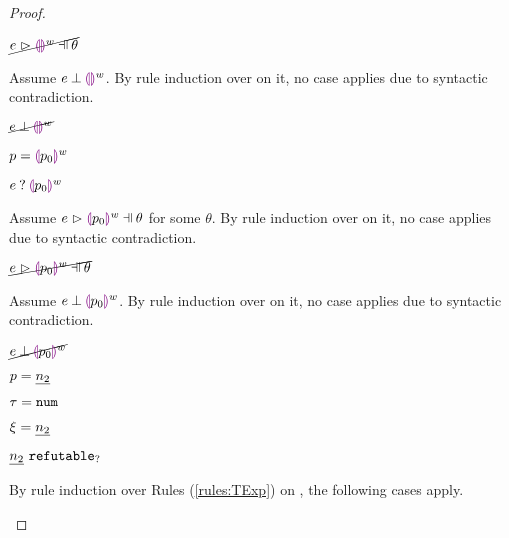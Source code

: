 \begin{proof}
\begin{byCases}
\begin{pfsteps*}
    \item $\cancel{\hpatmatch{e}{\hehole{w}}{\theta}}$ 
    \end{pfsteps*}
    Assume $e \mathbin{\bot} \textcolor{violet}{\llparenthesis}\textcolor{violet}{\rrparenthesis}^{w}$. By rule induction over  on it, no case applies due to syntactic contradiction.
    \begin{pfsteps*}
    \item $\cancel{e \mathbin{\bot} \textcolor{violet}{\llparenthesis}\textcolor{violet}{\rrparenthesis}^{w}}$ 
    \end{pfsteps*}
\item[\text{(\ref{rule:PTHole})}]
    \begin{pfsteps*}
    \item $p=\textcolor{violet}{\llparenthesis} p_0\textcolor{violet}{\rrparenthesis}^{w}$ 
    \item $e \mathbin{?} \textcolor{violet}{\llparenthesis} p_0\textcolor{violet}{\rrparenthesis}^{w}$ 
    \end{pfsteps*}
    Assume $\hpatmatch{e}{\hhole{p_0}{w}}{\theta}$ for some $\theta$. By rule induction over  on it, no case applies due to syntactic contradiction.
    \begin{pfsteps*}
    \item $\cancel{\hpatmatch{e}{\hhole{p_0}{w}}{\theta}}$ 
    \end{pfsteps*}
    Assume $e \mathbin{\bot} \textcolor{violet}{\llparenthesis} p_0\textcolor{violet}{\rrparenthesis}^{w}$. By rule induction over  on it, no case applies due to syntactic contradiction.
    \begin{pfsteps*}
    \item $\cancel{e \mathbin{\bot} \textcolor{violet}{\llparenthesis} p_0\textcolor{violet}{\rrparenthesis}^{w}}$ 
    \end{pfsteps*}
\item[\text{(\ref{rule:PTNum})}]
    \begin{pfsteps*}
    \item $p=\underline{n_2}$ 
    \item $\tau=\mathtt{num}$ 
    \item $\xi=\underline{n_2}$ 
    \item $\underline{n_2} ~\mathtt{refutable}_?$  
    \end{pfsteps*}
    By rule induction over Rules (\ref{rules:TExp}) on , the following cases apply.
    \begin{byCases}
    \item[\text{(\ref{rule:TEHole}),(\ref{rule:THole}),(\ref{rule:TAp}),(\ref{rule:TPrl}),(\ref{rule:TPrr}),(\ref{rule:TMatchZPre}),(\ref{rule:TMatchNZPre})}]

\end{byCases}
\end{byCases}
\end{proof}
